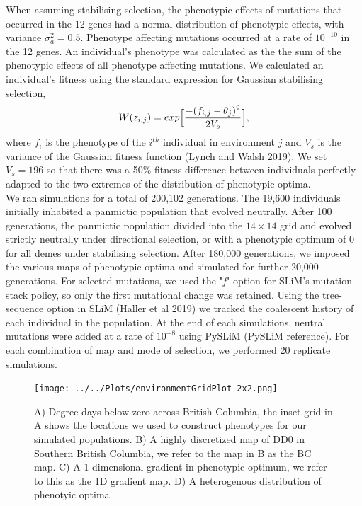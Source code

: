 \documentclass[11pt,twoside,lineno]{GSA_format}
\begin{document}
When assuming stabilising selection, the phenotypic effects of mutations that occurred in the 12 genes had a normal distribution of phenotypic effects, with variance $\sigma_a^2 = 0.5$. Phenotype affecting mutations occurred at a rate of $10^{-10}$ in the 12 genes. An individual's phenotype was calculated as the the sum of the phenotypic effects of all phenotype affecting mutations. We calculated an individual's fitness using the standard expression for Gaussian stabilising selection,
\begin{equation}
\notag
W(z_{i,j}) = exp \Big[\frac{-(f_{i,j} - \theta_j)^2}{2V_s}\Big],
\end{equation}
where $f_i$ is the phenotype of the $i^{th}$ individual in environment $j$ and $V_s$ is the variance of the Gaussian fitness function (Lynch and Walsh 2019). We set $V_s = 196$ so that there was a 50\% fitness difference between individuals perfectly adapted to the  two extremes of the distribution of phenotypic optima.\\ 

We ran simulations for a total of 200,102 generations. The 19,600 individuals initially inhabited a panmictic population that evolved neutrally. After 100 generations, the panmictic population divided into the $14\times14$ grid and evolved strictly neutrally under directional selection, or with a phenotypic optimum of 0 for all demes under stabilising selection. After 180,000 generations, we imposed the various maps of phenotypic optima and simulated for further 20,000 generations.  For selected mutations, we used the "\textit{f}" option for SLiM's mutation stack policy, so only the first mutational change was retained. Using the tree-sequence option in SLiM (Haller et al 2019) we tracked the coalescent history of each individual in the population. At the end of each simulations, neutral mutations were added at a rate of $10^{-8}$ using PySLiM (PySLiM reference). For each combination of map and mode of selection, we performed 20 replicate simulations. \\



\begin{figure}[H]
  \texttt{[image: ../../Plots/environmentGridPlot\_2x2.png]}
  \caption{A) Degree days below zero across British Columbia, the inset grid in A shows the locations we used to construct phenotypes for our simulated populations. B) A highly discretized map of DD0 in Southern British Columbia, we refer to the map in B as the BC map. C) A 1-dimensional gradient in phenotypic optimum, we refer to this as the 1D gradient map. D) A heterogenous distribution of phenotyic optima.}
  
  \label{fig:envGridPlot}
\end{figure}
\end{document}
